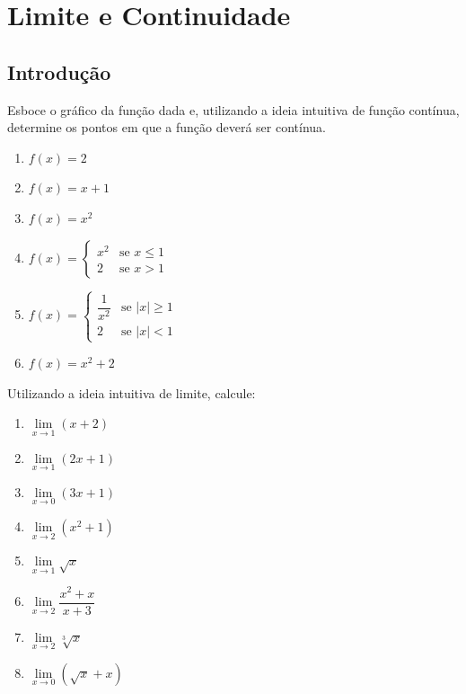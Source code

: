 \setcounter{section}{2}
\setcounter{subsection}{1}

\section{Limite e Continuidade}

\subsection{Introdução}

\begin{exercicio}[1]
Esboce o gráfico da função dada e, utilizando a ideia intuitiva de função contínua, determine os pontos em que a função deverá ser contínua.
\begin{enumerate}[label=\alph*)]
    \item $f(x) = 2$
    \item $f(x) = x + 1$
    \item $f(x) = x^2$
    \item $f(x) = \begin{cases} x^2 & \text{se } x \le 1 \\ 2 & \text{se } x > 1 \end{cases}$
    \item $f(x) = \begin{cases} \dfrac{1}{x^2} & \text{se } |x| \ge 1 \\ 2 & \text{se } |x| < 1 \end{cases}$
    \item $f(x) = x^2 + 2$
\end{enumerate}
\end{exercicio}

\begin{exercicio}[2]
Utilizando a ideia intuitiva de limite, calcule:
\begin{enumerate}[label=\alph*)]
    \item $\lim\limits_{x \to 1} (x + 2)$
    \item $\lim\limits_{x \to 1} (2x + 1)$
    \item $\lim\limits_{x \to 0} (3x + 1)$
    \item $\lim\limits_{x \to 2} (x^2 + 1)$
    \item $\lim\limits_{x \to 1} \sqrt{x}$
    \item $\lim\limits_{x \to 2} \dfrac{x^2 + x}{x + 3}$
    \item $\lim\limits_{x \to 2} \sqrt[3]{x}$
    \item $\lim\limits_{x \to 0} (\sqrt{x} + x)$
\end{enumerate}
\end{exercicio}

